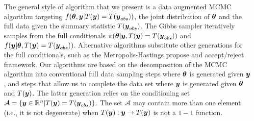 \documentclass[11pt]{article}
\def\bth{\mbox{\boldmath $\theta$}}
\newcommand{\by}{\mbox{\boldmath $y$}}
\newcommand{\red}[1]{{\color{red}#1}}
\newcommand{\green}[1]{{\color{green}#1}}
\begin{document}
The general style of algorithm that we present is a data augmented
MCMC algorithm targeting $f(\bth, \by |
T(\by)=T(\by_{obs}))$, the joint distribution of $\bth$ and the full
data given the summary statistic $T(\by_{obs})$.  %
 The Gibbs sampler \citep{gelfand1990} iteratively samples from the
 full conditionals $\pi(\bth|\by, T(\by)=T(\by_{obs}))$ and
 $f(\by|\bth, T(\by)=T(\by_{obs}))$.  
\green{Alternative algorithms substitute other generations for the full conditionals, such as the Metropolis-Hastings propose and accept/reject framework.  Our algorithms are based on the decomposition of the MCMC algorithm into conventional full data sampling steps where $\bth$ is generated given $\by$, and steps that allow us to complete the data set where $\by$ is generated given $\bth$ and $T(\by)$.  The latter generation relies on the conditioning set $\mathcal{A}=\{\by\in \mathbb{R}^n|T(\by)=T(\by_{obs})\}$.  The set $\mathcal{A}$ may contain more than one element (i.e., it is not degenerate) when $T(\by) : \by \rightarrow T(\by)$ is not a $1-1$ function.}
 
\end{document}
